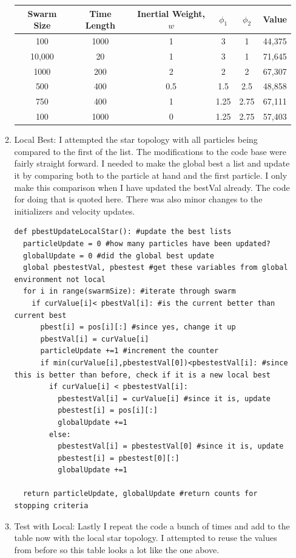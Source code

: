\documentclass[11pt]{article}
\begin{document}
\begin{enumerate}
\begin{enumerate}
\begin{tabular}{|c|c|c|c|c|c|}\hline
Swarm Size &Time Length & Inertial Weight, $w$ &$\phi_1$ & $\phi_2$& Value\\ \hline
100&1000&1&3&1&44,375\\
10,000&20&1&3&1&71,645\\
1000&200&2&2&2&67,307\\
500&400&0.5&1.5&2.5&48,858\\
750&400&1&1.25&2.75& 67,111\\
100&1000&0&1.25&2.75&57,403
\\ \hline
\end{tabular}
\item Local Best:  I attempted the star topology with all particles being compared to the first of the list.  The modifications to the code base were fairly straight forward.  I needed to make the global best a list and update it by comparing both to the particle at hand and the first particle.  I only make this comparison when I have updated the bestVal already.  The code for doing that is quoted here.  There was also minor changes to the initializers and velocity updates.
\begin{verbatim}
def pbestUpdateLocalStar(): #update the best lists
  particleUpdate = 0 #how many particles have been updated?
  globalUpdate = 0 #did the global best update
  global pbestestVal, pbestest #get these variables from global environment not local
  for i in range(swarmSize): #iterate through swarm
    if curValue[i]< pbestVal[i]: #is the current better than current best
      pbest[i] = pos[i][:] #since yes, change it up
      pbestVal[i] = curValue[i]
      particleUpdate +=1 #increment the counter
      if min(curValue[i],pbestestVal[0])<pbestestVal[i]: #since this is better than before, check if it is a new local best
        if curValue[i] < pbestestVal[i]:
          pbestestVal[i] = curValue[i] #since it is, update
          pbestest[i] = pos[i][:]
          globalUpdate +=1
        else:
          pbestestVal[i] = pbestestVal[0] #since it is, update
          pbestest[i] = pbestest[0][:]
          globalUpdate +=1

  return particleUpdate, globalUpdate #return counts for stopping criteria

\end{verbatim}
\item Test with Local:  Lastly I repeat the code a bunch of times and add to the table now with the local star topology.  I attempted to reuse the values from before so this table looks a lot like the one above.


\end{enumerate}
\end{enumerate}
\end{document}

